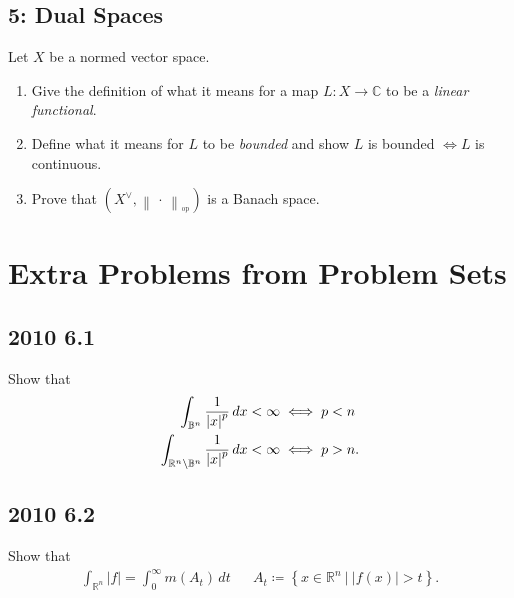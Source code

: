 \hypertarget{dual-spaces}{%
\subsection{5: Dual Spaces}\label{dual-spaces}}

Let \(X\) be a normed vector space.

\begin{enumerate}
\def\labelenumi{\alph{enumi}.}
\item
  Give the definition of what it means for a map \(L:X\to {\mathbb{C}}\)
  to be a \emph{linear functional}.
\item
  Define what it means for \(L\) to be \emph{bounded} and show \(L\) is
  bounded \(\iff L\) is continuous.
\item
  Prove that
  \((X^\vee, {\left\lVert {{\,\cdot\,}} \right\rVert}_{^{\operatorname{op}}})\)
  is a Banach space.
\end{enumerate}

\hypertarget{extra-problems-from-problem-sets}{%
\section{Extra Problems from Problem
Sets}\label{extra-problems-from-problem-sets}}

\hypertarget{section-3}{%
\subsection{2010 6.1}\label{section-3}}

Show that
\begin{align*}
\int_{{\mathbb{B}}^n} {1 \over {\left\lvert {x} \right\rvert}^p } \,dx&< \infty \iff p < n \\
\int_{{\mathbb{R}}^n\setminus{\mathbb{B}}^n} {1 \over {\left\lvert {x} \right\rvert}^p } \,dx&< \infty \iff p > n 
.\end{align*}

\hypertarget{section-4}{%
\subsection{2010 6.2}\label{section-4}}

Show that
\begin{align*}
\int_{{\mathbb{R}}^n} {\left\lvert { f} \right\rvert} = \int_0^{\infty } m(A_t)\,dt&& A_t \coloneqq\left\{{x\in {\mathbb{R}}^n {~\mathrel{\Big|}~}{\left\lvert {f(x)} \right\rvert} > t}\right\}
.\end{align*}

